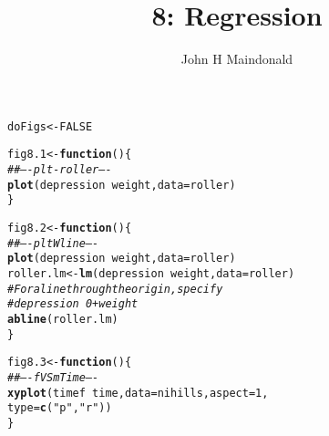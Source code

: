 \documentclass[12pt, a4paper,  BCOR=8.25mm, DIV=15]{scrartcl}\usepackage[]{graphicx}\usepackage[]{color}
\makeatletter
\newcommand{\hlnum}[1]{\textcolor[rgb]{0.686,0.059,0.569}{#1}}%
\newcommand{\hlstr}[1]{\textcolor[rgb]{0.192,0.494,0.8}{#1}}%
\newcommand{\hlcom}[1]{\textcolor[rgb]{0.678,0.584,0.686}{\textit{#1}}}%
\newcommand{\hlopt}[1]{\textcolor[rgb]{0,0,0}{#1}}%
\newcommand{\hlstd}[1]{\textcolor[rgb]{0.345,0.345,0.345}{#1}}%
\newcommand{\hlkwa}[1]{\textcolor[rgb]{0.161,0.373,0.58}{\textbf{#1}}}%
\newcommand{\hlkwb}[1]{\textcolor[rgb]{0.69,0.353,0.396}{#1}}%
\newcommand{\hlkwc}[1]{\textcolor[rgb]{0.333,0.667,0.333}{#1}}%
\newcommand{\hlkwd}[1]{\textcolor[rgb]{0.737,0.353,0.396}{\textbf{#1}}}%
\newenvironment{kframe}{%
 \def\at@end@of@kframe{}%
 \ifinner\ifhmode%
  \def\at@end@of@kframe{\end{minipage}}%
  \begin{minipage}{\columnwidth}%
 \fi\fi%
 \def\FrameCommand##1{\hskip\@totalleftmargin \hskip-\fboxsep
 \colorbox{shadecolor}{##1}\hskip-\fboxsep
     \hskip-\linewidth \hskip-\@totalleftmargin \hskip\columnwidth}%
 \MakeFramed {\advance\hsize-\width
   \@totalleftmargin\z@ \linewidth\hsize
   \@setminipage}}%
 {\par\unskip\endMakeFramed%
 \at@end@of@kframe}
\newenvironment{knitrout}{}{} %
\makeatother
\begin{document}




\title{8: Regression}
\author{John H Maindonald}
\maketitle

\begin{knitrout}
\color{fgcolor}\begin{kframe}
\begin{alltt}
\hlstd{doFigs} \hlkwb{<-} \hlnum{FALSE}
\end{alltt}
\end{kframe}
\end{knitrout}


\vspace*{-1cm}

\begin{knitrout}
\color{fgcolor}\begin{kframe}
\begin{alltt}
\hlstd{fig8.1} \hlkwb{<-} \hlkwa{function}\hlstd{()\{}
\hlcom{## ---- plt-roller ----}
\hlkwd{plot}\hlstd{(depression} \hlopt{~} \hlstd{weight,} \hlkwc{data}\hlstd{=roller)}
\hlstd{\}}
\end{alltt}
\end{kframe}
\end{knitrout}

\begin{knitrout}
\color{fgcolor}\begin{kframe}
\begin{alltt}
\hlstd{fig8.2} \hlkwb{<-} \hlkwa{function}\hlstd{()\{}
\hlcom{## ---- pltWline ----}
\hlkwd{plot}\hlstd{(depression} \hlopt{~} \hlstd{weight,} \hlkwc{data}\hlstd{=roller)}
\hlstd{roller.lm} \hlkwb{<-} \hlkwd{lm}\hlstd{(depression} \hlopt{~} \hlstd{weight,} \hlkwc{data}\hlstd{=roller)}
\hlcom{# For a line through the origin, specify}
\hlcom{# depression ~ 0 + weight}
\hlkwd{abline}\hlstd{(roller.lm)}
\hlstd{\}}
\end{alltt}
\end{kframe}
\end{knitrout}

\begin{knitrout}
\color{fgcolor}\begin{kframe}
\begin{alltt}
\hlstd{fig8.3} \hlkwb{<-} \hlkwa{function}\hlstd{()\{}
\hlcom{## ---- fVSmTime ----}
\hlkwd{xyplot}\hlstd{(timef}\hlopt{~}\hlstd{time,} \hlkwc{data}\hlstd{=nihills,} \hlkwc{aspect}\hlstd{=}\hlnum{1}\hlstd{,}
       \hlkwc{type}\hlstd{=}\hlkwd{c}\hlstd{(}\hlstr{"p"}\hlstd{,}\hlstr{"r"}\hlstd{))}
\hlstd{\}}
\end{alltt}
\end{kframe}
\end{knitrout}
\end{document}
